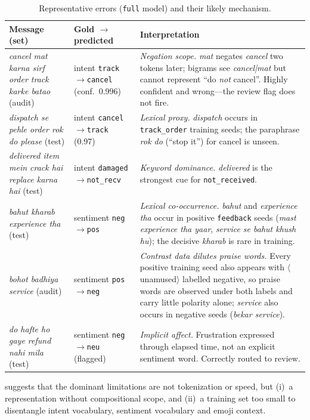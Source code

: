 \documentclass[11pt,a4paper]{article}
\theoremstyle{remark}
\newcommand{\lbl}[1]{\texttt{#1}}                      %
\newcommand{\hi}[1]{\textit{#1}}                       %
\newcommand{\emo}[1]{\textsf{\small$\langle$#1$\rangle$}} %
\begin{document}
\begin{table}[h]
\centering\small
\caption{Representative errors (\lbl{full} model) and their likely mechanism.}
\label{tab:errors}
\begin{tabularx}{\linewidth}{@{}p{4.9cm} p{2.9cm} X@{}}
\toprule
Message (set) & Gold $\to$ predicted & Interpretation \\
\midrule
\hi{cancel mat karna sirf order track karke batao} (audit) &
intent \lbl{track}$\to$\lbl{cancel} (conf.\ 0.996) &
\emph{Negation scope.} \hi{mat} negates \hi{cancel} two tokens later; bigrams
see \hi{cancel|mat} but cannot represent ``do \emph{not} cancel''. Highly
confident and wrong---the review flag does not fire. \\
\addlinespace
\hi{dispatch se pehle order rok do please} (test) &
intent \lbl{cancel}$\to$\lbl{track} (0.97) &
\emph{Lexical proxy.} \hi{dispatch} occurs in \lbl{track\_order} training
seeds; the paraphrase \hi{rok do} (``stop it'') for cancel is unseen. \\
\addlinespace
\hi{delivered item mein crack hai replace karna hai} (test) &
intent \lbl{damaged}$\to$\lbl{not\_recv} &
\emph{Keyword dominance.} \hi{delivered} is the strongest cue for
\lbl{not\_received}. \\
\addlinespace
\hi{bahut kharab experience tha} (test) &
sentiment \lbl{neg}$\to$\lbl{pos} &
\emph{Lexical co-occurrence.} \hi{bahut} and \hi{experience tha} occur in
positive \lbl{feedback} seeds (\hi{mast experience tha yaar}, \hi{service se
bahut khush hu}); the decisive \hi{kharab} is rare in training. \\
\addlinespace
\hi{bohot badhiya service} (audit) &
sentiment \lbl{pos}$\to$\lbl{neg} &
\emph{Contrast data dilutes praise words.} Every positive training seed also
appears with \emo{unamused} labelled negative, so praise words are observed
under both labels and carry little polarity alone; \hi{service} also occurs in
negative seeds (\hi{bekar service}). \\
\addlinespace
\hi{do hafte ho gaye refund nahi mila} (test) &
sentiment \lbl{neg}$\to$\lbl{neu} (flagged) &
\emph{Implicit affect.} Frustration expressed through elapsed time, not an
explicit sentiment word. Correctly routed to review. \\
\bottomrule
\end{tabularx}
\end{table}

 suggests that the dominant limitations are not tokenization
or speed, but (i)~a representation without compositional scope, and (ii)~a
training set too small to disentangle intent vocabulary, sentiment vocabulary
and emoji context.
\end{document}
